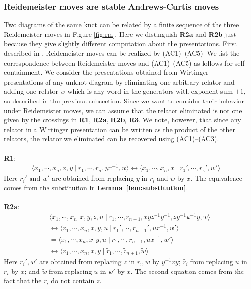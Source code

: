 \subsubsection{Reidemeister moves are stable Andrews-Curtis moves} Two diagrams of the same knot can be related by a finite sequence of the three
Reidemeister moves in Figure \ref{fig:rm}. Here we distinguish \textbf{R2a} and \textbf{R2b} just because they give slightly different computation about the presentations. First described in \cite{WADA1994241}, Reidemeister moves can be realized by (AC1)--(AC5). We list the correspondence between Reidemeister moves and (AC1)--(AC5) as follows for self-containment. We consider the presentations obtained from Wirtinger presentations of any unknot diagram by eliminating one arbitrary relator and adding one relator $w$ which is any word in the generators with exponent sum $\pm1$, as described in the previous subsection. Since we want to consider their behavior under Reidemeister moves, we can assume that the relator eliminated is not one given by the crossings in \textbf{R1}, \textbf{R2a}, \textbf{R2b}, \textbf{R3}. We note, however, that since any relator in a Wirtinger presentation can be written as the product of the other relators, the relator we eliminated can be recovered using (AC1)--(AC3).
\\
\\
\textbf{R1}:
\begin{align*}
\langle x_1,\cdots,x_n,x,y\mid r_1,\cdots,r_n,yx^{-1},w\rangle\longleftrightarrow\langle x_1,\cdots,x_n,x\mid r_1',\cdots,r_n',w'\rangle
\end{align*}
Here $r_i'$ and $w'$ are obtained from replacing $y$ in $r_i$ and $w$ by $x$. The equivalence comes from the substitution in \textbf{Lemma~\ref{lem:substitution}}.
\\
\\
\textbf{R2a}:
\begin{align*}
\,\,&\langle x_1,\cdots,x_n,x,y,z,u\mid r_1,\cdots,r_{n+1},xyz^{-1}y^{-1},zy^{-1}u^{-1}y,w\rangle
\\
&\longleftrightarrow\langle x_1,\cdots,x_n,x,y,u\mid r_1',\cdots,r_{n+1}',ux^{-1},w'\rangle
\\
&=\langle x_1,\cdots,x_n,x,y,u\mid r_1,\cdots,r_{n+1},ux^{-1},w'\rangle
\\
&\longleftrightarrow\langle x_1,\cdots,x_n,x,y\mid \tilde{r}_1,\cdots,\tilde{r}_{n+1},\tilde{w}\rangle
\end{align*}
Here $r_i',w'$ are obtained from replacing $z$ in $r_i,w$ by $y^{-1}xy$; $\tilde{r_i}$ from replacing $u$ in $r_i$ by $x$; and $\tilde{w}$ from replacing $u$ in $w'$ by $x$. The second equation comes from the fact that the $r_i$ do not contain $z$.
